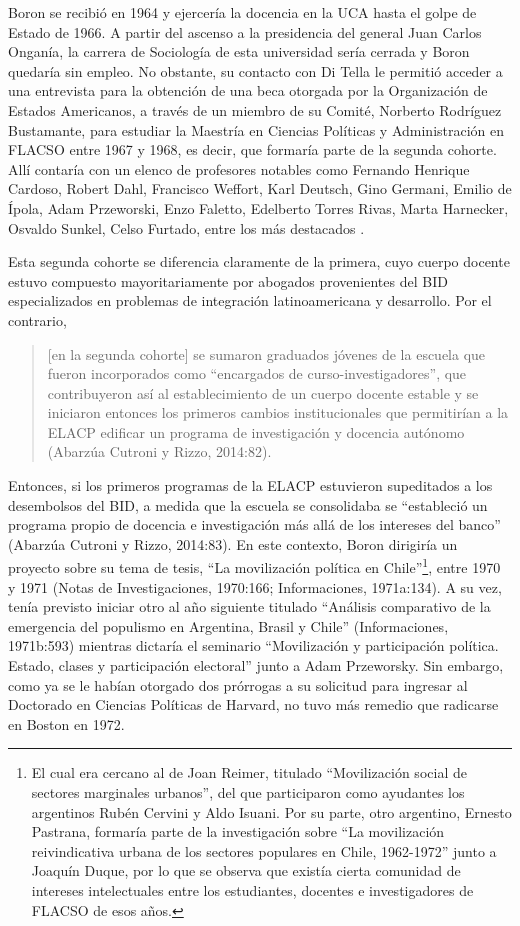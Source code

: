Boron se recibió en 1964 y ejercería la docencia en la UCA hasta el golpe de Estado de 1966. A partir del ascenso a la presidencia del general Juan Carlos Onganía, la carrera de Sociología de esta universidad sería cerrada y Boron quedaría sin empleo. No obstante, su contacto con Di Tella le permitió acceder a una entrevista para la obtención de una beca otorgada por la Organización de Estados Americanos, a través de un miembro de su Comité, Norberto Rodríguez Bustamante, para estudiar la Maestría en Ciencias Políticas y Administración en FLACSO entre 1967 y 1968, es decir, que formaría parte de la segunda cohorte. Allí contaría con un elenco de profesores notables como Fernando Henrique Cardoso, Robert Dahl, Francisco Weffort, Karl Deutsch, Gino Germani, Emilio de Ípola, Adam Przeworski, Enzo Faletto, Edelberto Torres Rivas, Marta Harnecker, Osvaldo Sunkel, Celso Furtado, entre los más destacados \parencite{1444-BORON2023}.

Esta segunda cohorte se diferencia claramente de la primera, cuyo cuerpo docente estuvo compuesto mayoritariamente por abogados provenientes del BID especializados en problemas de integración latinoamericana y desarrollo. Por el contrario,

\begin{quote}
[en la segunda cohorte] se sumaron graduados jóvenes de la escuela que fueron incorporados como ``encargados de curso-investigadores'', que contribuyeron así al establecimiento de un cuerpo docente estable y se iniciaron entonces los primeros cambios institucionales que permitirían a la ELACP edificar un programa de investigación y docencia autónomo (Abarzúa Cutroni y Rizzo, 2014:82).
\end{quote}

Entonces, si los primeros programas de la ELACP estuvieron supeditados a los desembolsos del BID, a medida que la escuela se consolidaba se ``estableció un programa propio de docencia e investigación más allá de los intereses del banco'' (Abarzúa Cutroni y Rizzo, 2014:83). En este contexto, Boron dirigiría un proyecto sobre su tema de tesis, ``La movilización política en Chile''\footnote{El cual era cercano al de Joan Reimer, titulado ``Movilización social de sectores marginales urbanos'', del que participaron como ayudantes los argentinos Rubén Cervini y Aldo Isuani. Por su parte, otro argentino, Ernesto Pastrana, formaría parte de la investigación sobre ``La movilización reivindicativa urbana de los sectores populares en Chile, 1962-1972'' junto a Joaquín Duque, por lo que se observa que existía cierta comunidad de intereses intelectuales entre los estudiantes, docentes e investigadores de FLACSO de esos años.}, entre 1970 y 1971 (Notas de Investigaciones, 1970:166; Informaciones, 1971a:134). A su vez, tenía previsto iniciar otro al año siguiente titulado ``Análisis comparativo de la emergencia del populismo en Argentina, Brasil y Chile'' (Informaciones, 1971b:593) mientras dictaría el seminario ``Movilización y participación política. Estado, clases y participación electoral'' junto a Adam Przeworsky. Sin embargo, como ya se le habían otorgado dos prórrogas a su solicitud para ingresar al Doctorado en Ciencias Políticas de Harvard, no tuvo más remedio que radicarse en Boston en 1972.

